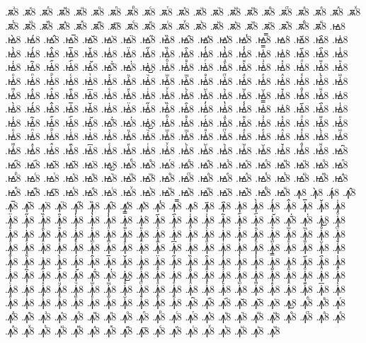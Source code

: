 {.ꙛⷥ8
.ꙛⷦ8
.ꙛⷧ8
.ꙛⷨ8
.ꙛⷩ8
.ꙛⷪ8
.ꙛⷫ8
.ꙛⷬ8
.ꙛⷭ8
.ꙛⷮ8
.ꙛⷯ8
.ꙛⷰ8
.ꙛⷱ8
.ꙛⷲ8
.ꙛⷳ8
.ꙛⷴ8
.ꙛⷵ8
.ꙛⷶ8
.ꙛⷷ8
.ꙛⷸ8
.ꙛⷹ8
.ꙛⷺ8
.ꙛⷻ8
.ꙛⷼ8
.ꙛⷽ8
.ꙛⷾ8
.ꙛⷿ8
.ꙛ꙯8
.ꙛꙴ8
.ꙛꙵ8
.ꙛꙶ8
.ꙛꙷ8
.ꙛꙸ8
.ꙛꙹ8
.ꙛꙺ8
.ꙛꙻ8
.ꙛ꙼8
.ꙛ꙽8
.ꙛꚞ8
.ꙛꚟ8
.ꙝ8
.ꙝ̀8
.ꙝ́8
.ꙝ̂8
.ꙝ̅8
.ꙝ̆8
.ꙝ̇8
.ꙝ̈8
.ꙝ̋8
.ꙝ̏8
.ꙝ̑8
.ꙝ̓8
.ꙝ̔8
.ꙝ̾8
.ꙝ̿8
.ꙝ͘8
.ꙝ҃8
.ꙝ҄8
.ꙝ҅8
.ꙝ҅̀8
.ꙝ҅́8
.ꙝ҅̂8
.ꙝ҅̅8
.ꙝ҅̆8
.ꙝ҅̇8
.ꙝ҅̈8
.ꙝ҅̋8
.ꙝ҅̏8
.ꙝ҅̑8
.ꙝ҅̓8
.ꙝ҅̔8
.ꙝ҅̾8
.ꙝ҅̿8
.ꙝ҅͘8
.ꙝ҅҃8
.ꙝ҅҄8
.ꙝ҅҅8
.ꙝ҅҆8
.ꙝ҅҇8
.ꙝ҅᷀8
.ꙝ҅᷁8
.ꙝ҅᷶8
.ꙝ᷷҅8
.ꙝ᷸҅8
.ꙝ᷹҅8
.ꙝ҅ⷠ8
.ꙝ҅ⷡ8
.ꙝ҅ⷢ8
.ꙝ҅ⷣ8
.ꙝ҅ⷤ8
.ꙝ҅ⷥ8
.ꙝ҅ⷦ8
.ꙝ҅ⷧ8
.ꙝ҅ⷨ8
.ꙝ҅ⷩ8
.ꙝ҅ⷪ8
.ꙝ҅ⷫ8
.ꙝ҅ⷬ8
.ꙝ҅ⷭ8
.ꙝ҅ⷮ8
.ꙝ҅ⷯ8
.ꙝ҅ⷰ8
.ꙝ҅ⷱ8
.ꙝ҅ⷲ8
.ꙝ҅ⷳ8
.ꙝ҅ⷴ8
.ꙝ҅ⷵ8
.ꙝ҅ⷶ8
.ꙝ҅ⷷ8
.ꙝ҅ⷸ8
.ꙝ҅ⷹ8
.ꙝ҅ⷺ8
.ꙝ҅ⷻ8
.ꙝ҅ⷼ8
.ꙝ҅ⷽ8
.ꙝ҅ⷾ8
.ꙝ҅ⷿ8
.ꙝ҅꙯8
.ꙝ҅ꙴ8
.ꙝ҅ꙵ8
.ꙝ҅ꙶ8
.ꙝ҅ꙷ8
.ꙝ҅ꙸ8
.ꙝ҅ꙹ8
.ꙝ҅ꙺ8
.ꙝ҅ꙻ8
.ꙝ҅꙼8
.ꙝ҅꙽8
.ꙝ҅ꚞ8
.ꙝ҅ꚟ8
.ꙝ҆8
.ꙝ҆̀8
.ꙝ҆́8
.ꙝ҆̂8
.ꙝ҆̅8
.ꙝ҆̆8
.ꙝ҆̇8
.ꙝ҆̈8
.ꙝ҆̋8
.ꙝ҆̏8
.ꙝ҆̑8
.ꙝ҆̓8
.ꙝ҆̔8
.ꙝ҆̾8
.ꙝ҆̿8
.ꙝ҆͘8
.ꙝ҆҃8
.ꙝ҆҄8
.ꙝ҆҅8
.ꙝ҆҆8
.ꙝ҆҇8
.ꙝ҆᷀8
.ꙝ҆᷁8
.ꙝ҆᷶8
.ꙝ᷷҆8
.ꙝ᷸҆8
.ꙝ᷹҆8
.ꙝ҆ⷠ8
.ꙝ҆ⷡ8
.ꙝ҆ⷢ8
.ꙝ҆ⷣ8
.ꙝ҆ⷤ8
.ꙝ҆ⷥ8
.ꙝ҆ⷦ8
.ꙝ҆ⷧ8
.ꙝ҆ⷨ8
.ꙝ҆ⷩ8
.ꙝ҆ⷪ8
.ꙝ҆ⷫ8
.ꙝ҆ⷬ8
.ꙝ҆ⷭ8
.ꙝ҆ⷮ8
.ꙝ҆ⷯ8
.ꙝ҆ⷰ8
.ꙝ҆ⷱ8
.ꙝ҆ⷲ8
.ꙝ҆ⷳ8
.ꙝ҆ⷴ8
.ꙝ҆ⷵ8
.ꙝ҆ⷶ8
.ꙝ҆ⷷ8
.ꙝ҆ⷸ8
.ꙝ҆ⷹ8
.ꙝ҆ⷺ8
.ꙝ҆ⷻ8
.ꙝ҆ⷼ8
.ꙝ҆ⷽ8
.ꙝ҆ⷾ8
.ꙝ҆ⷿ8
.ꙝ҆꙯8
.ꙝ҆ꙴ8
.ꙝ҆ꙵ8
.ꙝ҆ꙶ8
.ꙝ҆ꙷ8
.ꙝ҆ꙸ8
.ꙝ҆ꙹ8
.ꙝ҆ꙺ8
.ꙝ҆ꙻ8
.ꙝ҆꙼8
.ꙝ҆꙽8
.ꙝ҆ꚞ8
.ꙝ҆ꚟ8
.ꙝ҇8
.ꙝ᷀8
.ꙝ᷁8
.ꙝ᷶8
.ꙝ᷷8
.ꙝ᷸8
.ꙝ᷹8
.ꙝⷠ8
.ꙝⷡ8
.ꙝⷢ8
.ꙝⷣ8
.ꙝⷤ8
.ꙝⷥ8
.ꙝⷦ8
.ꙝⷧ8
.ꙝⷨ8
.ꙝⷩ8
.ꙝⷪ8
.ꙝⷫ8
.ꙝⷬ8
.ꙝⷭ8
.ꙝⷮ8
.ꙝⷯ8
.ꙝⷰ8
.ꙝⷱ8
.ꙝⷲ8
.ꙝⷳ8
.ꙝⷴ8
.ꙝⷵ8
.ꙝⷶ8
.ꙝⷷ8
.ꙝⷸ8
.ꙝⷹ8
.ꙝⷺ8
.ꙝⷻ8
.ꙝⷼ8
.ꙝⷽ8
.ꙝⷾ8
.ꙝⷿ8
.ꙝ꙯8
.ꙝꙴ8
.ꙝꙵ8
.ꙝꙶ8
.ꙝꙷ8
.ꙝꙸ8
.ꙝꙹ8
.ꙝꙺ8
.ꙝꙻ8
.ꙝ꙼8
.ꙝ꙽8
.ꙝꚞ8
.ꙝꚟ8
.ꙟ8
.ꙟ̀8
.ꙟ́8
.ꙟ̂8
.ꙟ̅8
.ꙟ̆8
.ꙟ̇8
.ꙟ̈8
.ꙟ̋8
.ꙟ̏8
.ꙟ̑8
.ꙟ̓8
.ꙟ̔8
.ꙟ̾8
.ꙟ̿8
.ꙟ͘8
.ꙟ҃8
.ꙟ҄8
.ꙟ҅8
.ꙟ҅̀8
.ꙟ҅́8
.ꙟ҅̂8
.ꙟ҅̅8
.ꙟ҅̆8
.ꙟ҅̇8
.ꙟ҅̈8
.ꙟ҅̋8
.ꙟ҅̏8
.ꙟ҅̑8
.ꙟ҅̓8
.ꙟ҅̔8
.ꙟ҅̾8
.ꙟ҅̿8
.ꙟ҅͘8
.ꙟ҅҃8
.ꙟ҅҄8
.ꙟ҅҅8
.ꙟ҅҆8
.ꙟ҅҇8
.ꙟ҅᷀8
.ꙟ҅᷁8
.ꙟ҅᷶8
.ꙟ᷷҅8
.ꙟ᷸҅8
.ꙟ᷹҅8
.ꙟ҅ⷠ8
.ꙟ҅ⷡ8
.ꙟ҅ⷢ8
.ꙟ҅ⷣ8
.ꙟ҅ⷤ8
.ꙟ҅ⷥ8
.ꙟ҅ⷦ8
.ꙟ҅ⷧ8
.ꙟ҅ⷨ8
.ꙟ҅ⷩ8
.ꙟ҅ⷪ8
.ꙟ҅ⷫ8
.ꙟ҅ⷬ8
.ꙟ҅ⷭ8
.ꙟ҅ⷮ8
.ꙟ҅ⷯ8
.ꙟ҅ⷰ8
.ꙟ҅ⷱ8
.ꙟ҅ⷲ8
.ꙟ҅ⷳ8
.ꙟ҅ⷴ8
.ꙟ҅ⷵ8
.ꙟ҅ⷶ8
.ꙟ҅ⷷ8
.ꙟ҅ⷸ8
.ꙟ҅ⷹ8
.ꙟ҅ⷺ8
.ꙟ҅ⷻ8
.ꙟ҅ⷼ8
.ꙟ҅ⷽ8
.ꙟ҅ⷾ8
.ꙟ҅ⷿ8
.ꙟ҅꙯8
.ꙟ҅ꙴ8
.ꙟ҅ꙵ8
.ꙟ҅ꙶ8
.ꙟ҅ꙷ8
.ꙟ҅ꙸ8
.ꙟ҅ꙹ8
.ꙟ҅ꙺ8
.ꙟ҅ꙻ8
.ꙟ҅꙼8
.ꙟ҅꙽8
.ꙟ҅ꚞ8
.ꙟ҅ꚟ8
.ꙟ҆8
.ꙟ҆̀8
.ꙟ҆́8
.ꙟ҆̂8
.ꙟ҆̅8
.ꙟ҆̆8
.ꙟ҆̇8
.ꙟ҆̈8
.ꙟ҆̋8
.ꙟ҆̏8
.ꙟ҆̑8
.ꙟ҆̓8
.ꙟ҆̔8
.ꙟ҆̾8
.ꙟ҆̿8
.ꙟ҆͘8
.ꙟ҆҃8
.ꙟ҆҄8
.ꙟ҆҅8
.ꙟ҆҆8
.ꙟ҆҇8
.ꙟ҆᷀8
.ꙟ҆᷁8
.ꙟ҆᷶8
.ꙟ᷷҆8
.ꙟ᷸҆8
.ꙟ᷹҆8
.ꙟ҆ⷠ8
.ꙟ҆ⷡ8
.ꙟ҆ⷢ8
.ꙟ҆ⷣ8
.ꙟ҆ⷤ8
.ꙟ҆ⷥ8
.ꙟ҆ⷦ8
.ꙟ҆ⷧ8
.ꙟ҆ⷨ8
.ꙟ҆ⷩ8
.ꙟ҆ⷪ8
.ꙟ҆ⷫ8
.ꙟ҆ⷬ8
.ꙟ҆ⷭ8
.ꙟ҆ⷮ8
.ꙟ҆ⷯ8
.ꙟ҆ⷰ8
.ꙟ҆ⷱ8
.ꙟ҆ⷲ8
.ꙟ҆ⷳ8
.ꙟ҆ⷴ8
.ꙟ҆ⷵ8
.ꙟ҆ⷶ8
.ꙟ҆ⷷ8
.ꙟ҆ⷸ8
.ꙟ҆ⷹ8
.ꙟ҆ⷺ8
.ꙟ҆ⷻ8
.ꙟ҆ⷼ8
.ꙟ҆ⷽ8
.ꙟ҆ⷾ8
.ꙟ҆ⷿ8
.ꙟ҆꙯8
.ꙟ҆ꙴ8
.ꙟ҆ꙵ8
.ꙟ҆ꙶ8
.ꙟ҆ꙷ8
.ꙟ҆ꙸ8
.ꙟ҆ꙹ8
.ꙟ҆ꙺ8
.ꙟ҆ꙻ8
.ꙟ҆꙼8
.ꙟ҆꙽8
.ꙟ҆ꚞ8
.ꙟ҆ꚟ8
.ꙟ҇8
.ꙟ᷀8
.ꙟ᷁8
.ꙟ᷶8
.ꙟ᷷8
.ꙟ᷸8
.ꙟ᷹8
.ꙟⷠ8
.ꙟⷡ8
.ꙟⷢ8
.ꙟⷣ8
.ꙟⷤ8
.ꙟⷥ8
.ꙟⷦ8
.ꙟⷧ8
.ꙟⷨ8
.ꙟⷩ8
.ꙟⷪ8
.ꙟⷫ8
.ꙟⷬ8
.ꙟⷭ8
.ꙟⷮ8
.ꙟⷯ8
.ꙟⷰ8
.ꙟⷱ8
.ꙟⷲ8
.ꙟⷳ8
.ꙟⷴ8
.ꙟⷵ8
.ꙟⷶ8
.ꙟⷷ8
.ꙟⷸ8
.ꙟⷹ8
.ꙟⷺ8
.ꙟⷻ8
.ꙟⷼ8
.ꙟⷽ8
.ꙟⷾ8
.ꙟⷿ8
.ꙟ꙯8
.ꙟꙴ8
.ꙟꙵ8
.ꙟꙶ8
.ꙟꙷ8
.ꙟꙸ8
.ꙟꙹ8
.ꙟꙺ8
.ꙟꙻ8
}
